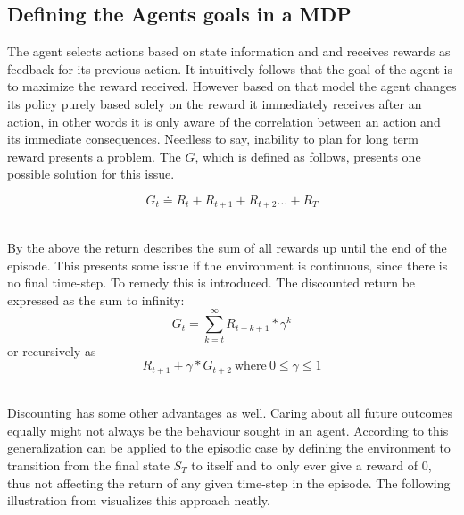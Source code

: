\subsection{Defining the Agents goals in a MDP}\label{subsec:goals}

The agent selects actions based on state information and and receives rewards as feedback for its previous action. It intuitively follows that the goal of the agent is to maximize the reward received. However based on that model the agent changes its policy purely based solely on the reward it immediately receives after an action, in other words it is only aware of the correlation between an action and its immediate consequences. Needless to say, inability to plan for long term reward presents a problem. The  $G$, which is defined as follows, presents one possible solution for this issue.

\begin{equation}\label{MDP:return}
    G_t \doteq R_t + R_{t+1} + R_{t+2} \dots + R_T
\end{equation}
\centerline{\small{}}

\noindent
\\ By the above the return describes the sum of all rewards up until the end of the episode. This presents some issue if the environment is continuous, since there is no final time-step. To remedy this  is introduced.  The discounted return be expressed as the sum to infinity:
\begin{equation}\label{MDP:discounted_return}
    G_t = \sum_{k=t}^{\infty} R_{t+k+1} * \gamma ^k 
\end{equation}
or recursively as
\begin{equation}\label{MDP:recursive_discounted_return}
    R_{t+1} + \gamma *G_{t+2} \mathrm{\ where\ } 0 \leq \gamma \leq 1
\end{equation}
\centerline{\small{}}

\noindent
\\ Discounting has some other advantages as well. Caring about all future outcomes equally might not always be the behaviour sought in an agent. According to  this generalization can be applied to the episodic case by defining the environment to transition from the final state $S_T$ to itself and to only ever give a reward of 0, thus not affecting the return of any given time-step in the episode. The following illustration from  visualizes this approach neatly.

